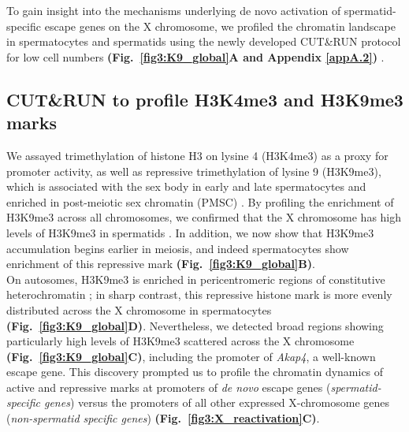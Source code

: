 To gain insight into the mechanisms underlying de novo activation of spermatid-specific escape genes on the X chromosome, we profiled the chromatin landscape in spermatocytes and spermatids using the newly developed CUT\&{}RUN protocol for low cell numbers \textbf{(Fig.~\ref{fig3:K9_global}A and Appendix \ref{appA.2})} \citep{Skene2018}. 

\subsection{CUT\&{}RUN to profile H3K4me3 and H3K9me3 marks}

We assayed trimethylation of histone H3 on lysine 4 (H3K4me3) as a proxy for promoter activity, as well as repressive trimethylation of lysine 9 (H3K9me3), which is associated with the sex body in early and late spermatocytes and enriched in post-meiotic sex chromatin (PMSC) \citep{Greaves2006, Tachibana2007}. By profiling the enrichment of H3K9me3 across all chromosomes, we confirmed that the X chromosome has high levels of H3K9me3 in spermatids \citep{Moretti2016}. In addition, we now show that H3K9me3 accumulation begins earlier in meiosis, and indeed spermatocytes show enrichment of this repressive mark \textbf{(Fig.~\ref{fig3:K9_global}B)}. \\

On autosomes, H3K9me3 is enriched in pericentromeric regions of constitutive heterochromatin \citep{Peters2001}; in sharp contrast, this repressive histone mark is more evenly distributed across the X chromosome in spermatocytes  \textbf{(Fig.~\ref{fig3:K9_global}D)}. Nevertheless, we detected broad regions showing particularly high levels of H3K9me3 scattered across the X chromosome  \textbf{(Fig.~\ref{fig3:K9_global}C)}, including the promoter of \textit{Akap4}, a well-known escape gene. This discovery prompted us to profile the chromatin dynamics of active and repressive marks at promoters of \emph{de novo} escape genes (\emph{spermatid-specific genes}) versus the promoters of all other expressed X-chromosome genes (\emph{non-spermatid specific genes}) \textbf{(Fig.~\ref{fig3:X_reactivation}C)}.

\newpage

